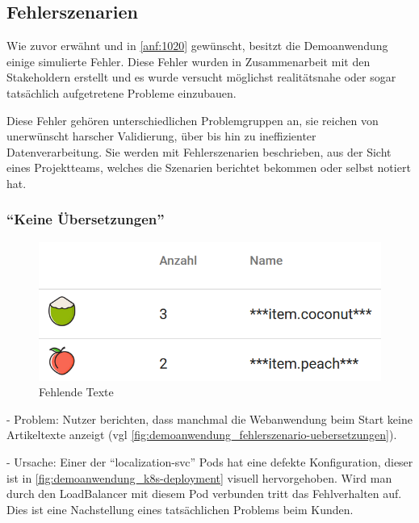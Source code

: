 \subsection{Fehlerszenarien}
\label{subsec:fehlerszenarien}

Wie zuvor erwähnt und in \autoref{anf:1020} gewünscht, besitzt die Demoanwendung einige simulierte Fehler. Diese Fehler wurden in Zusammenarbeit mit den Stakeholdern erstellt und es wurde versucht möglichst realitätsnahe oder sogar tatsächlich aufgetretene Probleme einzubauen.

Diese Fehler gehören unterschiedlichen Problemgruppen an, sie reichen von unerwünscht harscher Validierung, über  bis hin zu ineffizienter Datenverarbeitung. Sie werden mit Fehlerszenarien beschrieben, aus der Sicht eines Projektteams, welches die Szenarien berichtet bekommen oder selbst notiert hat.

\subsubsection{\enquote{Keine Übersetzungen}}

\begin{figure}
\centering
\vspace{-\baselineskip}
\includegraphics[width=\linewidth]{img/04_erstellung-poc/demoanwendung_fehlerszenario-uebersetzungen}
\caption{Fehlende Texte}
\label{fig:demoanwendung_fehlerszenario-uebersetzungen}
\end{figure}

- Problem: Nutzer berichten, dass manchmal die Webanwendung beim Start keine Artikeltexte anzeigt (vgl \autoref{fig:demoanwendung_fehlerszenario-uebersetzungen}).

- Ursache: Einer der \enquote{localization-svc} Pods hat eine defekte Konfiguration, dieser ist in \autoref{fig:demoanwendung_k8s-deployment} visuell hervorgehoben. Wird man durch den LoadBalancer mit diesem Pod verbunden tritt das Fehlverhalten auf. Dies ist eine Nachstellung eines tatsächlichen Problems beim Kunden.

